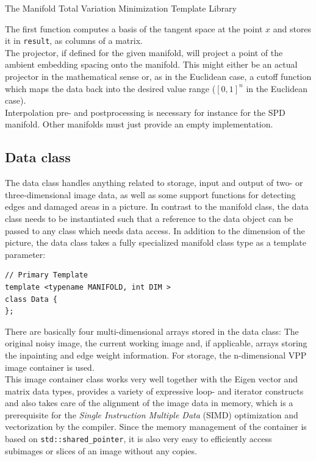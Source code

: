\begin{chapter}{The Manifold Total Variation Minimization Template Library}
\begin{description}
	The first function computes a basis of the tangent space at the point $x$ and stores it in \texttt{result}, as columns of a matrix.\\
	The projector, if defined for the given manifold, will project a point of the ambient embedding spacing onto the manifold. This might either be an actual projector in the mathematical sense or, as in the Euclidean case, a cutoff
	function which maps the data back into the desired value range ($[0,1]^n$ in the Euclidean case). \\
	Interpolation pre- and postprocessing is necessary for instance for the SPD manifold. Other manifolds must just provide an empty implementation.
\end{description}
\subsection{Data class} %
\label{sub:Data class}
The data class handles anything related to storage, input and output of two- or three-dimensional image data, as well as some support functions for detecting edges and damaged areas in a picture.
In contrast to the manifold class, the data class needs to be instantiated such that a reference to the data object can be passed to any class which needs data access. In addition
to the dimension of the picture, the data class takes a fully specialized manifold class type as a template parameter:

\cppinline
\begin{lstlisting}
// Primary Template
template <typename MANIFOLD, int DIM >
class Data {
};    
\end{lstlisting}

There are basically four multi-dimensional arrays stored in the data class: The original noisy image, the current working image and, if applicable, arrays storing the inpainting
and edge weight information. For storage, the n-dimensional VPP \cite{VPP} image container is used.\\

This image container class works very well together with the Eigen vector and matrix data types, provides a variety of expressive loop- and iterator constructs and also takes care
of the alignment of the image data in memory, which is a prerequisite for the \textit{Single Instruction Multiple Data} (SIMD) optimization and vectorization by the compiler.
Since the memory management of the container is based on \texttt{std::shared\_pointer}, it is also very easy to efficiently access subimages or slices of an image without any copies.\\


\end{chapter}
